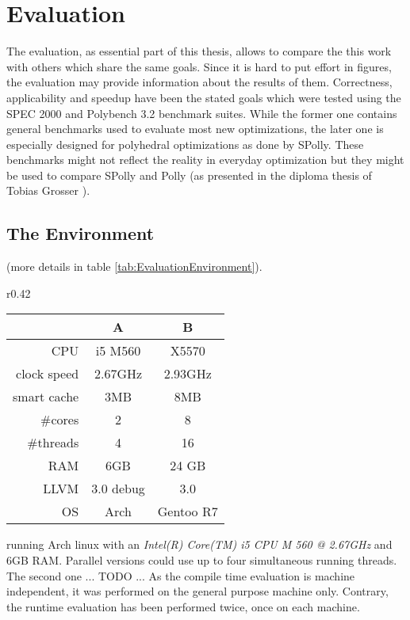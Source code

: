 
\chapter{Evaluation} %
\label{Chapter5}

\red
\begin{shaded}

The evaluation, as essential part of this thesis, allows to compare the this 
work with others which share the same goals. Since it is hard to put effort in
figures, the evaluation may provide information about the results of them.
Correctness, applicability and speedup have been the stated goals which were 
tested using the SPEC 2000 and Polybench 3.2 benchmark suites. While the former
one contains general benchmarks used to evaluate most new optimizations, the 
later one is especially designed for polyhedral optimizations as done by SPolly.
These benchmarks might not reflect the reality in everyday optimization but
they might be used to compare SPolly and Polly 
(as presented in the diploma thesis of Tobias Grosser \cite{grosser:thesis}).


\section{The Environment}

(more details in table \ref{tab:EvaluationEnvironment}). 
\begin{wraptable}[]{r}{0.42\textwidth}
  \caption{The evaluation environment}
  \begin{center}
    \begin{tabular}{ r | c c }
      & A & B \\
      \hline
            CPU & i5 M560 & X5570 \\ 
    clock speed & 2.67GHz & 2.93GHz \\
    smart cache & 3MB & 8MB \\
        \#cores & 2 & 8 \\
      \#threads & 4 & 16 \\
            RAM & 6GB & 24 GB \\
           LLVM & 3.0 debug & 3.0 \\
             OS & Arch  & Gentoo R7 \\
    \end{tabular}
  \end{center}
  \label{tab:EvaluationEnvironment}
\end{wraptable}
running Arch linux with an
\textit{Intel(R) Core(TM) i5 CPU M 560 @ 2.67GHz} and 6GB RAM. Parallel versions
could use up to four simultaneous running threads. 
The second one ... TODO ... 
As the compile time evaluation is machine independent, it was 
performed on the general purpose machine only. Contrary, the runtime evaluation 
has been performed twice, once on each machine. 


\end{shaded}
